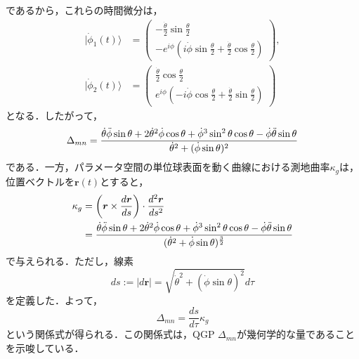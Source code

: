 \documentclass[a4paper, titlepage]{jsreport}
\begin{document}
であるから，これらの時間微分は，
\begin{align}
  |\Dot{\phi}_1(t) \rangle &= 
  \begin{pmatrix}
    -\frac{\Dot{\theta}}{2} \sin \frac{\theta}{2}\\
    -e^{i\phi} (i\Dot{\phi} \sin \frac{\theta}{2} + \frac{\Dot{\theta}}{2}\cos \frac{\theta}{2})
  \end{pmatrix},\\
  |\Dot{\phi}_2(t) \rangle &=
  \begin{pmatrix}
   \frac{\Dot{\theta}}{2} \cos \frac{\theta}{2}\\
    e^{i\phi} (-i\Dot{\phi} \cos \frac{\theta}{2} + \frac{\Dot{\theta}}{2}\sin \frac{\theta}{2})
  \end{pmatrix}
\end{align}
となる．したがって，
\begin{equation}
  \Delta_{mn} = \frac{\Dot{\theta} \Ddot{\phi} \sin \theta + 2 \Dot{\theta}^2 \Dot{\phi} \cos\theta + \Dot{\phi}^3 \sin^2\theta \cos \theta - \Dot{\phi} \Ddot{\theta} \sin \theta}{\Dot{\theta}^2 + (\Dot{\phi} \sin \theta)^2}
\end{equation}
である．一方，パラメータ空間の単位球表面を動く曲線における測地曲率$\kappa_g$は，位置ベクトルを$\bm{r}(t)$とすると，
\begin{align}
  \kappa_g &= \left(\bm{r} \times \frac{d \bm{r}}{ds} \right) \cdot \frac{d^2 \bm{r}}{d s^2}\\
  &= \frac{\Dot{\theta} \Ddot{\phi} \sin \theta + 2 \Dot{\theta}^2 \Dot{\phi} \cos\theta + \Dot{\phi}^3 \sin^2\theta \cos \theta - \Dot{\phi} \Ddot{\theta} \sin \theta} {(\Dot{\theta}^2 + \Dot{\phi} \sin \theta)^{\frac{3}{2}}}
\end{align}
で与えられる．ただし，線素
\begin{equation}
  ds := |d\bm{r}| = \sqrt{\Dot{\theta}^2 + (\Dot{\phi} \sin \theta)^2}  d\tau
\end{equation}
を定義した．よって，
\begin{equation}
  \Delta_{mn} = \frac{ds}{d\tau} \kappa_g  
\end{equation}
という関係式が得られる．この関係式は，QGP $\Delta_{mn}$が幾何学的な量であることを示唆している．
\end{document}
